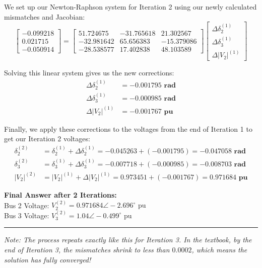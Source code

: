 \documentclass[11pt]{article}
\begin{document}
\begin{stepbox}
We set up our Newton-Raphson system for Iteration 2 using our newly calculated mismatches and Jacobian:
\begin{equation*}
\begin{bmatrix} -0.099218 \\ 0.021715 \\ -0.050914 \end{bmatrix} 
= 
\begin{bmatrix} 
51.724675 & -31.765618 & 21.302567 \\ 
-32.981642 & 65.656383 & -15.379086 \\ 
-28.538577 & 17.402838 & 48.103589 
\end{bmatrix} 
\begin{bmatrix} \Delta \delta_2^{(1)} \\ \Delta \delta_3^{(1)} \\ \Delta |V_2|^{(1)} \end{bmatrix}
\end{equation*}

Solving this linear system gives us the new corrections:
\begin{align*}
    \Delta \delta_2^{(1)} &= \mathbf{-0.001795 \text{ rad}} \\
    \Delta \delta_3^{(1)} &= \mathbf{-0.000985 \text{ rad}} \\
    \Delta |V_2|^{(1)} &= \mathbf{-0.001767 \text{ pu}}
\end{align*}

Finally, we apply these corrections to the voltages from the end of Iteration 1 to get our Iteration 2 voltages:
\begin{align*}
    \delta_2^{(2)} &= \delta_2^{(1)} + \Delta \delta_2^{(1)} = -0.045263 + (-0.001795) = \mathbf{-0.047058 \text{ rad}} \\
    \delta_3^{(2)} &= \delta_3^{(1)} + \Delta \delta_3^{(1)} = -0.007718 + (-0.000985) = \mathbf{-0.008703 \text{ rad}} \\
    |V_2|^{(2)} &= |V_2|^{(1)} + \Delta |V_2|^{(1)} = 0.973451 + (-0.001767) = \mathbf{0.971684 \text{ pu}}
\end{align*}

\textbf{Final Answer after 2 Iterations:}\\
Bus 2 Voltage: $V_2^{(2)} = 0.971684 \angle -2.696^\circ \text{ pu}$ \\
Bus 3 Voltage: $V_3^{(2)} = 1.04 \angle -0.499^\circ \text{ pu}$

\vspace{0.3cm}
\hrule
\vspace{0.3cm}
\textit{Note: The process repeats exactly like this for Iteration 3. In the textbook, by the end of Iteration 3, the mismatches shrink to less than $0.0002$, which means the solution has fully converged!}
\end{stepbox}
\end{document}
